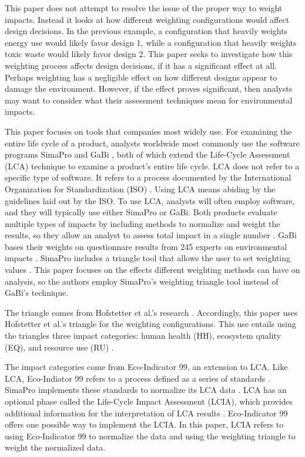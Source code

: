 \documentclass[final,journal,10pt,letterpaper,oneside,twocolumn,compsoc]%
{IEEEtran}
\begin{document}
This paper does not attempt to resolve the issue of the proper way to weight
impacts. Instead it looks at how different weighting configurations would affect
design decisions. In the previous example, a configuration that heavily weights
energy use would likely favor design 1, while a configuration that heavily
weights toxic waste would likely favor design 2. This paper seeks to investigate
how this weighting process affects design decisions, if it has a significant
effect at all. Perhaps weighting has a negligible effect on how different
designs appear to damage the environment. However, if the effect proves
significant, then analysts may want to consider what their assessment techniques
mean for environmental impacts.

This paper focuses on tools that companies most widely use. For examining the
entire life cycle of a product, analysts worldwide most commonly use the
software programs SimaPro and GaBi \cite{hermann}, both of which extend the
Life-Cycle Assessment (LCA) technique to examine a product's entire life cycle.
LCA does not refer to a specific type of software. It refers to a process
documented by
the International Organization for Standardization (ISO) \cite{14040}
\cite{14044}. Using LCA means abiding by the guidelines laid out by the ISO.
To use LCA, analysts will often employ software, and they will typically
use either SimaPro or GaBi. Both products evaluate
multiple types of impacts by including methods to normalize and weight the
results, so they allow an analyst to assess total impact in a single number
\cite{gabi} \cite{simapro}. GaBi bases their weights on questionnare results
from 245 experts on environmental impacts \cite{gabi}. SimaPro includes a
triangle tool that allows the user to set weighting values \cite{simapro}. This
paper focuses on the effects different weighting methods can have on
analysis, so the authors employ SimaPro's weighting triangle tool instead of
GaBi's technique.

The triangle comes from Hofstetter et al.'s research \cite{triangle}.
Accordingly, this paper uses Hofstetter et al.'s triangle for the weighting
configurations. This use entails using the triangles three impact categories:
human health (HH), ecosystem quality (EQ), and resource use (RU)
\cite{triangle}.

The impact categories come from Eco-Indicator 99, an extension to LCA. Like LCA,
Eco-Indiator 99 refers to a process defined as a series of standards \cite{pre}.
SimaPro implements these standards to normalize its LCA data \cite{simapro}.
LCA has an optional phase called the Life-Cycle Impact
Assessment (LCIA), which provides additional information for the interpretation
of LCA results \cite{14044}. Eco-Indicator 99 offers one possible way
to implement the LCIA. In this paper, LCIA refers to using
Eco-Indicator 99 to normalize the data and using the weighting triangle to
weight the normalized data.
\end{document}
